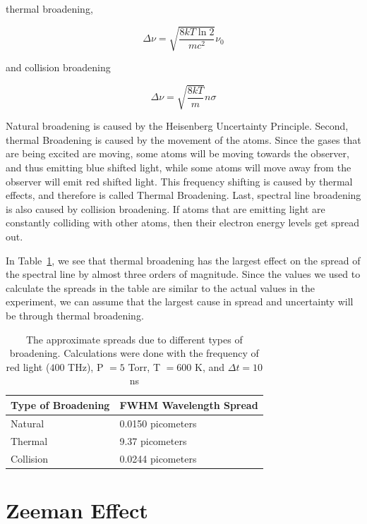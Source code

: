 thermal broadening,

\begin{equation}
  \Delta \nu = \sqrt{\frac{8kT\ln 2}{mc^2}}\nu_{0}
  \label{Doppler Equation}
\end{equation}

and collision broadening

\begin{equation}
  \Delta \nu = \sqrt{\frac{8kT}{m}} n \sigma
  \label{Collision Equation}
\end{equation}  

Natural broadening is caused by the Heisenberg Uncertainty Principle. Second, thermal Broadening is caused by the movement of the atoms. Since the gases that are being excited are moving, some atoms will be moving towards the observer, and thus emitting blue shifted light, while some atoms will move away from the observer will emit red shifted light. This frequency shifting is caused by thermal effects, and therefore is called Thermal Broadening. Last, spectral line broadening is also caused by collision broadening. If atoms that are emitting light are constantly colliding with other atoms, then their electron energy levels get spread out.

In Table~\ref{Spread}, we see that thermal broadening has the largest effect on the spread of the spectral line by almost three orders of magnitude. Since the values we used to calculate the spreads in the table are similar to the actual values in the experiment, we can assume that the largest cause in spread and uncertainty will be through thermal broadening. 

\begin{table}[h]
  \begin{tabular}{|l|l|}
  \hline
  Type of Broadening & FWHM Wavelength Spread          \\ \hline
  Natural            & 0.0150 picometers               \\
  Thermal            & 9.37 picometers                 \\
  Collision          & 0.0244 picometers               \\ \hline
  \end{tabular}
  \caption{The approximate spreads due to different types of broadening. Calculations were done with the frequency of red light ($400$ THz), P $= 5$ Torr, T $= 600$ K, and $\Delta t = 10$ ns}
  \label{Spread}
\end{table}

\section{Zeeman Effect}

